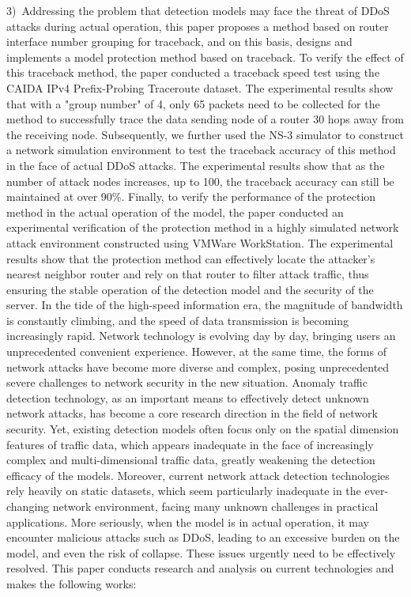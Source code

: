 \begin{eabstract}
    3)~Addressing the problem that detection models may face the threat of DDoS attacks during actual operation, this paper proposes a method based on router interface number grouping for traceback, and on this basis, designs and implements a model protection method based on traceback. To verify the effect of this traceback method, the paper conducted a traceback speed test using the CAIDA IPv4 Prefix-Probing Traceroute dataset. The experimental results show that with a "group number" of 4, only 65 packets need to be collected for the method to successfully trace the data sending node of a router 30 hops away from the receiving node. Subsequently, we further used the NS-3 simulator to construct a network simulation environment to test the traceback accuracy of this method in the face of actual DDoS attacks. The experimental results show that as the number of attack nodes increases, up to 100, the traceback accuracy can still be maintained at over 90\%. Finally, to verify the performance of the protection method in the actual operation of the model, the paper conducted an experimental verification of the protection method in a highly simulated network attack environment constructed using VMWare WorkStation. The experimental results show that the protection method can effectively locate the attacker's nearest neighbor router and rely on that router to filter attack traffic, thus ensuring the stable operation of the detection model and the security of the server.
    In the tide of the high-speed information era, the magnitude of bandwidth is constantly climbing, and the speed of data transmission is becoming increasingly rapid. Network technology is evolving day by day, bringing users an unprecedented convenient experience. However, at the same time, the forms of network attacks have become more diverse and complex, posing unprecedented severe challenges to network security in the new situation. Anomaly traffic detection technology, as an important means to effectively detect unknown network attacks, has become a core research direction in the field of network security. Yet, existing detection models often focus only on the spatial dimension features of traffic data, which appears inadequate in the face of increasingly complex and multi-dimensional traffic data, greatly weakening the detection efficacy of the models. Moreover, current network attack detection technologies rely heavily on static datasets, which seem particularly inadequate in the ever-changing network environment, facing many unknown challenges in practical applications. More seriously, when the model is in actual operation, it may encounter malicious attacks such as DDoS, leading to an excessive burden on the model, and even the risk of collapse. These issues urgently need to be effectively resolved. This paper conducts research and analysis on current technologies and makes the following works:


\end{eabstract}
